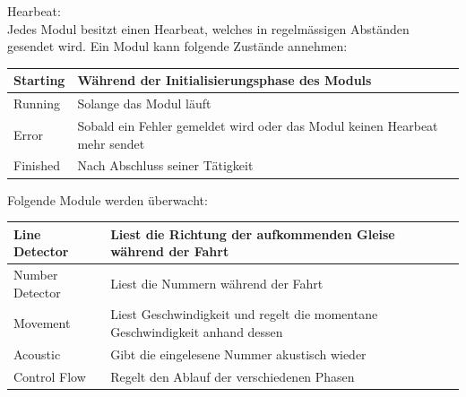 \documentclass[../../main.tex]{subfiles}
\begin{document}
Hearbeat:\\
Jedes Modul besitzt einen Hearbeat, welches in regelmässigen Abständen gesendet wird. Ein Modul kann folgende Zustände annehmen:
\begin{table}[H]
    \begin{tabular}{ll}
    \hline
    Starting & Während der Initialisierungsphase des Moduls \\ \hline
    Running & Solange das Modul läuft\\ \hline
    Error & Sobald ein Fehler gemeldet wird oder das Modul keinen Hearbeat mehr sendet\\ \hline
    Finished & Nach Abschluss seiner Tätigkeit\\ \hline
    \end{tabular}
\end{table} 
Folgende Module werden überwacht:
\begin{table}[H]
    \begin{tabular}{ll}
    \hline
    Line Detector & Liest die Richtung der aufkommenden Gleise während der Fahrt \\ \hline
    Number Detector & Liest die Nummern während der Fahrt\\ \hline
    Movement & Liest Geschwindigkeit und regelt die momentane Geschwindigkeit anhand dessen\\ \hline
    Acoustic & Gibt die eingelesene Nummer akustisch wieder\\ \hline
    Control Flow & Regelt den Ablauf der verschiedenen Phasen \\ \hline
    \end{tabular}
\end{table}
\end{document}
